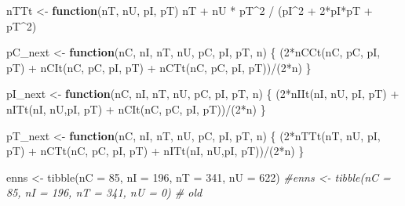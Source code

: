 \documentclass[
]{article}
\newenvironment{Shaded}{\begin{snugshade}}{\end{snugshade}}
\newcommand{\AttributeTok}[1]{\textcolor[rgb]{0.77,0.63,0.00}{#1}}
\newcommand{\CommentTok}[1]{\textcolor[rgb]{0.56,0.35,0.01}{\textit{#1}}}
\newcommand{\ControlFlowTok}[1]{\textcolor[rgb]{0.13,0.29,0.53}{\textbf{#1}}}
\newcommand{\DecValTok}[1]{\textcolor[rgb]{0.00,0.00,0.81}{#1}}
\newcommand{\FunctionTok}[1]{\textcolor[rgb]{0.00,0.00,0.00}{#1}}
\newcommand{\NormalTok}[1]{#1}
\newcommand{\OtherTok}[1]{\textcolor[rgb]{0.56,0.35,0.01}{#1}}
\newcommand{\SpecialCharTok}[1]{\textcolor[rgb]{0.00,0.00,0.00}{#1}}
\begin{document}
\begin{Shaded}
\begin{Highlighting}[]
\NormalTok{nTTt }\OtherTok{\textless{}{-}} \ControlFlowTok{function}\NormalTok{(nT, nU, pI, pT) nT }\SpecialCharTok{+}\NormalTok{ nU }\SpecialCharTok{*}\NormalTok{ pT}\SpecialCharTok{\^{}}\DecValTok{2} \SpecialCharTok{/}\NormalTok{ (pI}\SpecialCharTok{\^{}}\DecValTok{2} \SpecialCharTok{+} \DecValTok{2}\SpecialCharTok{*}\NormalTok{pI}\SpecialCharTok{*}\NormalTok{pT }\SpecialCharTok{+}\NormalTok{ pT}\SpecialCharTok{\^{}}\DecValTok{2}\NormalTok{)}

\NormalTok{pC\_next }\OtherTok{\textless{}{-}} \ControlFlowTok{function}\NormalTok{(nC, nI, nT, nU, pC, pI, pT, n) \{}
\NormalTok{  (}\DecValTok{2}\SpecialCharTok{*}\FunctionTok{nCCt}\NormalTok{(nC, pC, pI, pT) }\SpecialCharTok{+} \FunctionTok{nCIt}\NormalTok{(nC, pC, pI, pT) }\SpecialCharTok{+} \FunctionTok{nCTt}\NormalTok{(nC, pC, pI, pT))}\SpecialCharTok{/}\NormalTok{(}\DecValTok{2}\SpecialCharTok{*}\NormalTok{n)}
\NormalTok{\}}

\NormalTok{pI\_next }\OtherTok{\textless{}{-}} \ControlFlowTok{function}\NormalTok{(nC, nI, nT, nU, pC, pI, pT, n) \{}
\NormalTok{  (}\DecValTok{2}\SpecialCharTok{*}\FunctionTok{nIIt}\NormalTok{(nI, nU, pI, pT) }\SpecialCharTok{+} \FunctionTok{nITt}\NormalTok{(nI, nU,pI, pT) }\SpecialCharTok{+} \FunctionTok{nCIt}\NormalTok{(nC, pC, pI, pT))}\SpecialCharTok{/}\NormalTok{(}\DecValTok{2}\SpecialCharTok{*}\NormalTok{n)}
\NormalTok{\}}

\NormalTok{pT\_next }\OtherTok{\textless{}{-}} \ControlFlowTok{function}\NormalTok{(nC, nI, nT, nU, pC, pI, pT, n) \{}
\NormalTok{  (}\DecValTok{2}\SpecialCharTok{*}\FunctionTok{nTTt}\NormalTok{(nT, nU, pI, pT) }\SpecialCharTok{+} \FunctionTok{nCTt}\NormalTok{(nC, pC, pI, pT) }\SpecialCharTok{+} \FunctionTok{nITt}\NormalTok{(nI, nU,pI, pT))}\SpecialCharTok{/}\NormalTok{(}\DecValTok{2}\SpecialCharTok{*}\NormalTok{n)}
\NormalTok{\}}

\NormalTok{enns }\OtherTok{\textless{}{-}} \FunctionTok{tibble}\NormalTok{(}\AttributeTok{nC =} \DecValTok{85}\NormalTok{, }\AttributeTok{nI =} \DecValTok{196}\NormalTok{, }\AttributeTok{nT =} \DecValTok{341}\NormalTok{, }\AttributeTok{nU =} \DecValTok{622}\NormalTok{)}
\CommentTok{\#enns \textless{}{-} tibble(nC = 85, nI = 196, nT = 341, nU = 0) \# old }


\end{Highlighting}
\end{Shaded}
\end{document}
